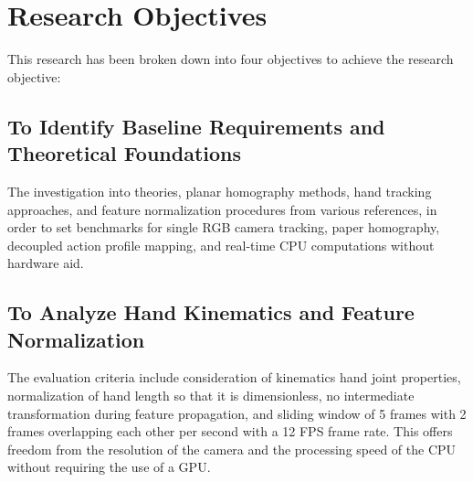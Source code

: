 \section{Research Objectives}
\label{sec:research_text_objectives}
This research has been broken down into four objectives to achieve the research objective:

\subsection{To Identify Baseline Requirements and Theoretical Foundations}
\label{subsec:obj_identify}
The investigation into theories, planar homography methods, hand tracking approaches, and feature normalization procedures from various references, in order to set benchmarks for single RGB camera tracking, paper homography, decoupled action profile mapping, and real-time CPU computations without hardware aid.

\subsection{To Analyze Hand Kinematics and Feature Normalization}
\label{subsec:obj_analyze}
The evaluation criteria include consideration of kinematics hand joint properties, normalization of hand length so that it is dimensionless, no intermediate transformation during feature propagation, and sliding window of 5 frames with 2 frames overlapping each other per second with a 12 FPS frame rate. This offers freedom from the resolution of the camera and the processing speed of the CPU without requiring the use of a GPU.

